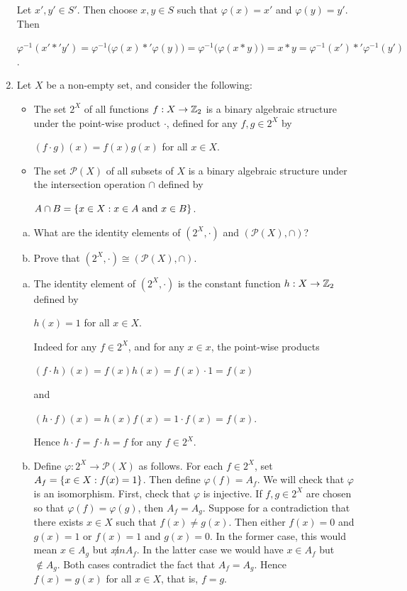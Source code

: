 \documentclass[11pt,fleqn,dvipsnames,usenames]{article}
\begin{document}
\begin{enumerate}[1.]
\solution Let $x',y'\in S'$.  Then choose $x,y\in S$ such that $\varphi(x) = x'$ and $\varphi(y) = y'$.  Then
\begin{center}
$\varphi^{-1}(x'*'y') = \varphi^{-1}\big(\varphi(x)*'\varphi(y)\big) = \varphi^{-1}\big(\varphi(x*y)\big) = x*y = \varphi^{-1}(x')*'\varphi^{-1}(y')$.
\end{center}

\item Let $X$ be a non-empty set, and consider the following:
\begin{itemize}
\item The set $2^{X}$ of all functions $f:X\to\mathbb{Z}_{2}$ is a binary algebraic structure under the point-wise product $\cdot$, defined for any $f,g\in 2^{X}$ by
\begin{center}
$(f \cdot g)(x) = f(x)g(x)$ for all $x\in X$.
\end{center}
\item The set $\mathcal{P}(X)$ of all subsets of $X$ is a binary algebraic structure under the intersection operation $\cap$ defined by
\begin{center}
$A\cap B = \left\{x\in X:x\in A\text{ and }x\in B\right\}$.
\end{center}
\end{itemize}
\begin{enumerate}[(a)]
\item What are the identity elements of $(2^{X}, \cdot)$ and $(\mathcal{P}(X), \cap)$?
\item Prove that $(2^{X}, \cdot)\cong (\mathcal{P}(X), \cap)$.
\end{enumerate}
%
\vsmsp

\solution
\begin{enumerate}[(a)]
\item The identity element of $(2^{X},\cdot)$ is the constant function $h:X\to\mathbb{Z}_{2}$ defined by
\begin{center}
$h(x) = 1$ for all $x\in X$.
\end{center}
Indeed for any $f\in 2^{X}$, and for any $x\in x$, the point-wise products
\begin{center}
$(f\cdot h)(x) = f(x)h(x) = f(x)\cdot 1 = f(x)$
\end{center}
and
\begin{center}
$(h\cdot f)(x) = h(x)f(x) = 1\cdot f(x) = f(x)$.
\end{center}
Hence $h\cdot f = f\cdot h = f$ for any $f\in 2^{X}$.
\item Define $\varphi:2^{X}\to \mathcal{P}(X)$ as follows.  For each $f\in 2^{X}$, set $A_{f} = \left\{x\in X:f(x) = 1\right\}$.  Then define $\varphi(f) = A_{f}$.  We will check that $\varphi$ is an isomorphism.  First, check that $\varphi$ is injective.  If $f,g\in 2^{X}$ are chosen so that $\varphi(f) = \varphi(g)$, then $A_{f} = A_{g}$.  Suppose for a contradiction that there exists $x\in X$ such that $f(x)\neq g(x)$.  Then either $f(x) = 0$ and $g(x) = 1$ or $f(x) = 1$ and $g(x) = 0$.  In the former case, this would mean $x\in A_{g}$ but $x\not in A_{f}$.  In the latter case we would have $x \in A_{f}$ but $\notin A_{g}$.  Both cases contradict the fact that $A_{f} = A_{g}$.  Hence $f(x) = g(x)$ for all $x\in X$, that is, $f = g$.
\vsmsp


\end{enumerate}
\end{enumerate}
\end{document}
